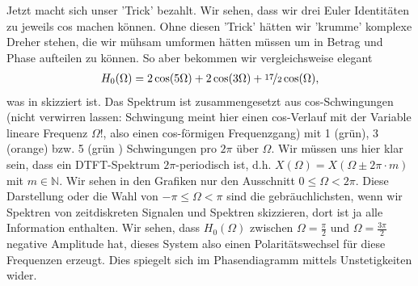 %
Jetzt macht sich unser 'Trick' bezahlt. Wir sehen, dass wir drei Euler Identitäten
zu jeweils cos machen können. Ohne diesen 'Trick' hätten wir 'krumme' komplexe Dreher
stehen, die wir mühsam umformen hätten müssen um in Betrag und Phase aufteilen zu können.
So aber bekommen wir vergleichsweise elegant
\begin{align}
\label{eq:64BE42BAEF_H0}
H_0(\Omega) = 2 \cos(5\Omega) + 2 \cos(3\Omega) + \nicefrac{17}{2} \cos(\Omega),
\end{align}
was in  skizziert ist.
%
Das Spektrum ist zusammengesetzt aus cos-Schwingungen
(nicht verwirren lassen: Schwingung meint hier einen cos-Verlauf mit der Variable
lineare Frequenz $\Omega$!, also einen cos-förmigen Frequenzgang)
mit 1 (grün), 3 (orange)
bzw. 5 (grün ) Schwingungen pro $2\pi$ über $\Omega$.
%
Wir müssen uns hier klar sein, dass ein DTFT-Spektrum $2\pi$-periodisch ist, d.h.
$X(\Omega) = X(\Omega \pm 2\pi \cdot m)$ mit $m\in\mathbb{N}$. Wir sehen in den
Grafiken nur den
Ausschnitt $0\leq \Omega < 2\pi$. Diese Darstellung oder die Wahl von
$-\pi\leq \Omega < \pi$ sind die gebräuchlichsten, wenn wir
Spektren von zeitdiskreten Signalen und Spektren skizzieren, dort ist ja
alle Information enthalten.
%
Wir sehen, dass $H_0(\Omega)$ zwischen $\Omega=\frac{\pi}{2}$ und $\Omega=\frac{3\pi}{2}$
negative Amplitude hat, dieses System also einen Polaritätswechsel für diese
Frequenzen erzeugt.
Dies spiegelt sich im Phasendiagramm mittels Unstetigkeiten wider.


